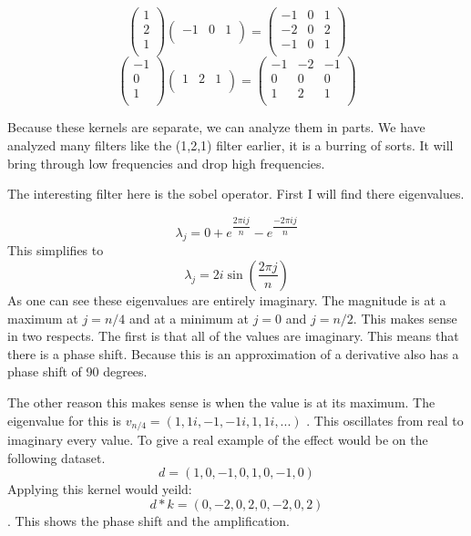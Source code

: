 \documentclass[11pt]{article}
\begin{document}
$$\begin{pmatrix}
	1\\
	2\\
	1\\
\end{pmatrix}\begin{pmatrix}
	-1 & 0 & 1\\
\end{pmatrix} = \begin{pmatrix}
	-1 & 0 & 1\\
	-2 & 0 & 2\\
	-1 & 0 & 1\\
\end{pmatrix}$$
$$\begin{pmatrix}
	-1\\
	0\\
	1\\
\end{pmatrix}\begin{pmatrix}
	1 & 2 & 1\\
\end{pmatrix} =\begin{pmatrix}
	-1 & -2 & -1\\
	0 & 0 & 0\\
	1 & 2 & 1\\
\end{pmatrix}$$

Because these kernels are separate, we can analyze them in parts. We have analyzed many filters like the (1,2,1) filter earlier, it is a burring of sorts. It will bring through low frequencies and drop high frequencies. 

The interesting filter here is the sobel operator. First I will find there eigenvalues.

$$\lambda_j = 0 + e^{\dfrac{2\pi i j}{n}}-e^{\dfrac{-2\pi i j}{n}}$$
This simplifies to
$$\lambda_j = 2i\sin(\dfrac{2 \pi j}{n})$$
As one can see these eigenvalues are entirely imaginary. The magnitude is at a maximum at $j=n/4$ and at a minimum at $j=0$ and $j=n/2$. This makes sense in two respects. The first is that all of the values are imaginary. This means that there is a phase shift. Because this is an approximation of a derivative also has a phase shift of 90 degrees.

The other reason this makes sense is when the value is at its maximum. The eigenvalue for this is $v_{n/4} = (1,1i,-1,-1i,1, 1i, ...)$ . This oscillates from real to imaginary every value. To give a real example of the effect would be on the following dataset. 
$$d = (1,0,-1,0,1,0,-1,0)$$
Applying this kernel would yeild:
$$d*k = (0,-2,0,2,0,-2,0,2)$$. 
This shows the phase shift and the amplification. 
\end{document}
